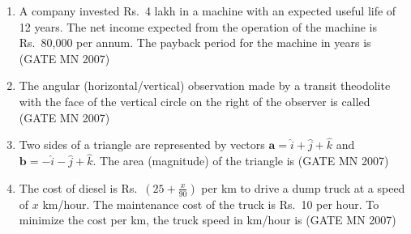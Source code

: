 \documentclass[journal]{IEEEtran}
\begin{document}
\begin{enumerate}
\item A company invested Rs.\ 4 lakh in a machine with an expected useful life of 12 years. The net income expected from the operation of the machine is Rs.\ 80,000 per annum. The payback period for the machine in years is
\hfill (GATE MN 2007)	
\begin{enumerate}
\end{enumerate}


\item The angular (horizontal/vertical) observation made by a transit theodolite with the face of the vertical circle on the right of the observer is called
	\hfill (GATE MN 2007)
\begin{enumerate}
\end{enumerate}





\item Two sides of a triangle are represented by vectors $\mathbf{a} = \hat{i} + \hat{j} + \hat{k}$ and $\mathbf{b} = -\hat{i} - \hat{j} + \hat{k}$. The area (magnitude) of the triangle is
\hfill (GATE MN 2007)
\begin{enumerate}
\end{enumerate}


\item The cost of diesel is Rs.\ $\left(25 + \frac{x}{90}\right)$ per km to drive a dump truck at a speed of $x$ km/hour. The maintenance cost of the truck is Rs.\ 10 per hour. To minimize the cost per km, the truck speed in km/hour is
	\hfill (GATE MN 2007)
\begin{enumerate}
\end{enumerate}




\end{enumerate}
\end{document}
